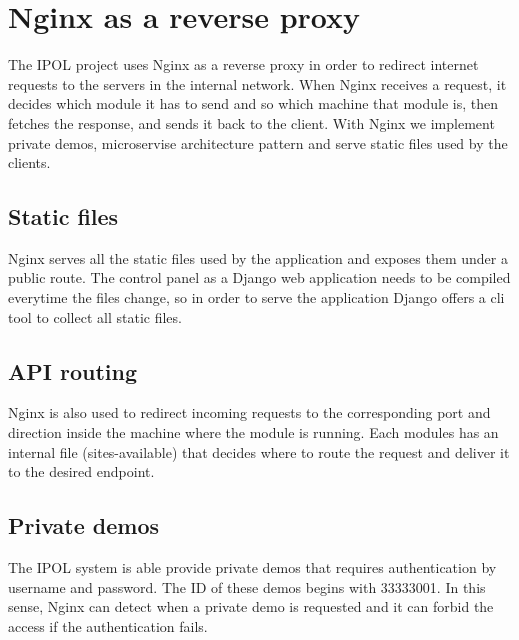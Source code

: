 
\section{Nginx as a reverse proxy}
\label{sec:reverse_proxy}
The IPOL project uses Nginx as a reverse proxy in order to redirect internet requests to the servers in the 
internal network. When Nginx receives a request, it decides which module it has to send and so which machine that module is, 
then fetches the response, and sends it back to the client. With Nginx we implement private demos, microservise architecture 
pattern and serve static files used by the clients.

\subsection{Static files}
Nginx serves all the static files used by the application and exposes them under a public route. The control panel as a Django 
web application needs to be compiled everytime the files change, so in order to serve the application Django offers a cli tool to 
collect all static files. 

\subsection{API routing}
Nginx is also used to redirect incoming requests to the corresponding port and direction inside the machine where the module is 
running. Each modules has an internal file (sites-available) that decides where to route the request and deliver it to the desired endpoint.

\subsection{Private demos}
The IPOL system is able provide private demos that requires authentication by username and password. The ID of these demos begins with 
33333001. In this sense, Nginx can detect when a private demo is requested and it can forbid the access if the authentication fails.